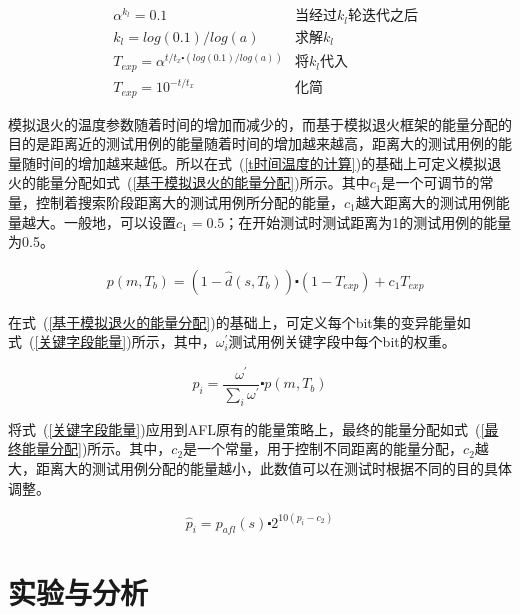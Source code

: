 \begin{equation}\label{t时间温度的计算}
\begin{aligned}
& \alpha^{k_{l}} = 0.1 & \text{当经过}k_{l}\text{轮迭代之后}\\
& k_{l} = log(0.1)/log(a) &\text{求解}k_{l}\\
& T_{exp} = \alpha^{t/t_{x} \centerdot (log(0.1)/log(a))} & \text{将}k_{l}\text{代入}\\
& T_{exp} = 10^{-t/t_{x}} &\text{化简}
\end{aligned}
\end{equation}

模拟退火的温度参数随着时间的增加而减少的，而基于模拟退火框架的能量分配的目的是距离近的测试用例的能量随着时间的增加越来越高，距离大的测试用例的能量随时间的增加越来越低。所以在式~(\ref{t时间温度的计算})的基础上可定义模拟退火的能量分配如式~(\ref{基于模拟退火的能量分配})所示。其中$c_{1}$是一个可调节的常量，控制着搜索阶段距离大的测试用例所分配的能量，$c_{1}$越大距离大的测试用例能量越大。一般地，可以设置$c_{1} = 0.5$；在开始测试时测试距离为1的测试用例的能量为0.5。

\begin{equation}\label{基于模拟退火的能量分配}
\begin{aligned}
& p(m,T_{b}) = (1- \hat{d}(s,T_{b})) \centerdot (1-T_{exp}) + c_{1}T_{exp}
\end{aligned}
\end{equation}

在式~(\ref{基于模拟退火的能量分配})的基础上，可定义每个bit集的变异能量如式~(\ref{关键字段能量})所示，其中，$\omega^{'}_{i}$测试用例关键字段中每个bit的权重。

\begin{equation}\label{关键字段能量}
p_{i} = \frac{\omega^{'}}{\sum_{i} \omega^{'}} \centerdot p(m,T_{b})
\end{equation}

将式~(\ref{关键字段能量})应用到AFL原有的能量策略上，最终的能量分配如式~(\ref{最终能量分配})所示。其中，$c_{2}$是一个常量，用于控制不同距离的能量分配，$c_{2}$越大，距离大的测试用例分配的能量越小，此数值可以在测试时根据不同的目的具体调整。

\begin{equation}\label{最终能量分配}
\hat{p}_{i} = p_{afl}(s) \centerdot 2^{10(p_{i}-c_{2})}
\end{equation}

\section{实验与分析}

